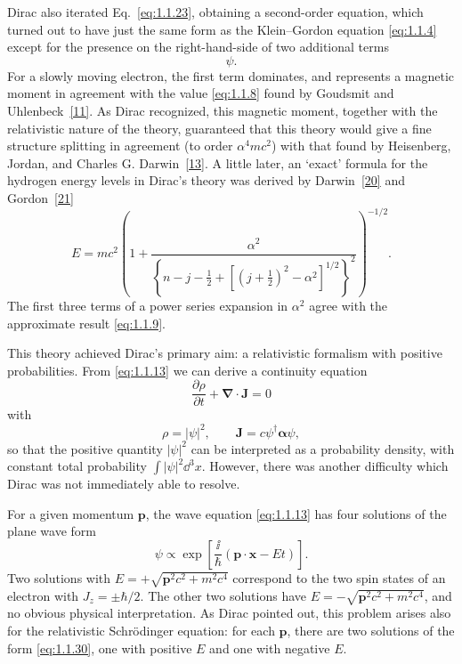 Dirac also iterated Eq.~\eqref{eq:1.1.23}, obtaining a second-order equation,
which turned out to have just the same form as the Klein--Gordon equation
\eqref{eq:1.1.4} except for the presence on the right-hand-side of two additional
terms
\begin{equation}
  [-e\hbar c\boldsymbol{\sigma}\cdot\mathbf{B}-ie\hbar c\boldsymbol{\alpha}\cdot\mathbf{E}]\psi.
  \tag{1.1.26}\label{eq:1.1.26}
\end{equation}
For a slowly moving electron, the first term dominates, and represents a
magnetic moment in agreement with the value \eqref{eq:1.1.8} found by Goudsmit
and Uhlenbeck~\hyperref[ref:1.11]{[11]}. As Dirac recognized, this magnetic moment, together
with the relativistic nature of the theory, guaranteed that this theory
would give a fine structure splitting in agreement (to order $\alpha^4mc^2$) with
that found by Heisenberg, Jordan, and Charles G. Darwin~\hyperref[ref:1.13]{[13]}. A little later,
an `exact' formula for the hydrogen energy levels in Dirac's theory was
derived by Darwin~\hyperref[ref:1.20]{[20]} and Gordon~\hyperref[ref:1.21]{[21]}
\begin{equation}
  E=mc^2\left(
  1+\frac{\alpha^2}{
  \left\{n-j-\tfrac12+
  \left[(j+\tfrac12)^2-\alpha^2\right]^{1/2}\right\}^2}
  \right)^{-1/2}.
  \tag{1.1.27}\label{eq:1.1.27}
\end{equation}
The first three terms of a power series expansion in $\alpha^2$ agree with the
approximate result \eqref{eq:1.1.9}.

This theory achieved Dirac's primary aim: a relativistic formalism with
positive probabilities. From \eqref{eq:1.1.13} we can derive a continuity equation
\begin{equation}
  \frac{\partial\rho}{\partial t}+\boldsymbol{\nabla}\cdot\mathbf{J}=0
  \tag{1.1.28}\label{eq:1.1.28}
\end{equation}
with
\begin{equation}
  \rho=|\psi|^2,
  \qquad
  \mathbf{J}=c\psi^\dagger\boldsymbol{\alpha}\psi,
  \tag{1.1.29}\label{eq:1.1.29}
\end{equation}
so that the positive quantity $|\psi|^2$ can be interpreted as a probability
density, with constant total probability $\int|\psi|^2\dd^3x$. However, there was
another difficulty which Dirac was not immediately able to resolve.

For a given momentum $\mathbf{p}$, the wave equation \eqref{eq:1.1.13} has four solutions
of the plane wave form
\begin{equation}
  \psi\propto\exp\left[\frac{\ii}{\hbar}(\mathbf{p}\cdot\mathbf{x}-Et)\right].
  \tag{1.1.30}\label{eq:1.1.30}
\end{equation}
Two solutions with $E=+\sqrt{\mathbf{p}^2c^2+m^2c^4}$ correspond to the two spin states
of an electron with $J_z=\pm\hbar/2$. The other two solutions have
$E=-\sqrt{\mathbf{p}^2c^2+m^2c^4}$, and no obvious physical interpretation. As Dirac pointed
out, this problem arises also for the relativistic Schr\"odinger equation: for
each $\mathbf{p}$, there are two solutions of the form \eqref{eq:1.1.30}, one with positive $E$
and one with negative $E$.

